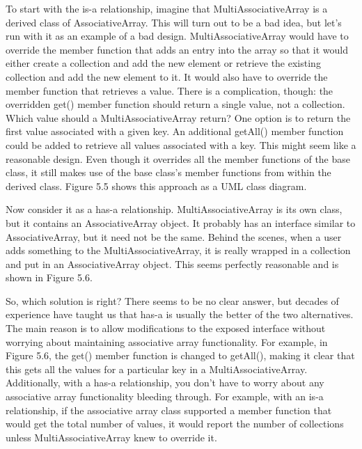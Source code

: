 To start with the is-a relationship, imagine that MultiAssociativeArray is a derived class of AssociativeArray. This will turn out to be a bad idea, but let’s run with it as an example of a bad design. MultiAssociativeArray would have to override the member function that adds an entry into the array so that it would either create a collection and add the new element or retrieve the existing collection and add the new element to it. It would also have to override the member function that retrieves a value. There is a complication, though: the overridden get() member function should return a single value, not a collection. Which value should a MultiAssociativeArray return? One option is to return the first value associated with a given key. An additional getAll() member function could be added to retrieve all values associated with a key. This might seem like a reasonable design. Even though it overrides all the member functions of the base class, it still makes use of the base class’s member functions from within the derived class. Figure 5.5 shows this approach as a UML class diagram.


Now consider it as a has-a relationship. MultiAssociativeArray is its own class, but it contains an AssociativeArray object. It probably has an interface similar to AssociativeArray, but it need not be the same. Behind the scenes, when a user adds something to the MultiAssociativeArray, it is really wrapped in a collection and put in an AssociativeArray object. This seems perfectly reasonable and is shown in Figure 5.6.


So, which solution is right? There seems to be no clear answer, but decades of experience have taught us that has-a is usually the better of the two alternatives. The main reason is to allow modifications to the exposed interface without worrying about maintaining associative array functionality. For example, in Figure 5.6, the get() member function is changed to getAll(), making it clear that this gets all the values for a particular key in a MultiAssociativeArray. Additionally, with a has-a relationship, you don’t have to worry about any associative array functionality bleeding through. For example, with an is-a relationship, if the associative array class supported a member function that would get the total number of values, it would report the number of collections unless MultiAssociativeArray knew to override it.

